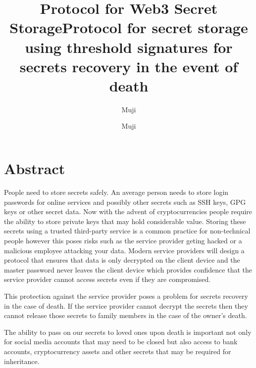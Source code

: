 \documentclass[a4paper,titlepage,oneside]{article}
\title{Protocol for Web3 Secret Storage}
\author{Muji}
\renewcommand{\paragraph}{\small}
\begin{document}
\fancyhead{}
\fancyfoot{}

\rhead{\textbf{\textsc{}}}
\lfoot{\thepage}

\title{Protocol for secret storage using threshold signatures for secrets recovery in the event of death}

\author{Muji}

\maketitle

\tableofcontents

\section{Abstract}
\paragraph{People need to store secrets safely. An average person needs to store login passwords for online services and possibly other secrets such as SSH keys, GPG keys or other secret data. Now with the advent of cryptocurrencies people require the ability to store private keys that may hold considerable value. Storing these secrets using a trusted third-party service is a common practice for non-technical people however this poses risks such as the service provider geting hacked or a malicious employee attacking your data. Modern service providers will design a protocol that ensures that data is only decrypted on the client device and the master password never leaves the client device which provides confidence that the service provider cannot access secrets even if they are compromised.}

\paragraph{This protection against the service provider poses a problem for secrets recovery in the case of death. If the service provider cannot decrypt the secrets then they cannot release those secrets to family members in the case of the owner's death.}

\paragraph{The ability to pass on our secrets to loved ones upon death is important not only for social media accounts that may need to be closed but also access to bank accounts, cryptocurrency assets and other secrets that may be required for inheritance.}
\end{document}
